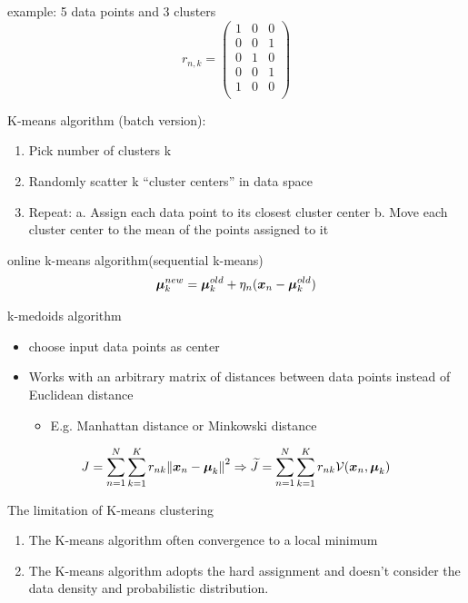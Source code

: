 \documentclass[11pt]{article}
\begin{document}
example: 5 data points and 3 clusters
\[
r_{n,k}=\begin{pmatrix}
 1 & 0 & 0 \\
 0 & 0 & 1 \\
 0 & 1 & 0 \\
 0 & 0 & 1 \\
 1 & 0 & 0 \\
\end{pmatrix}
\]

K-means algorithm (batch version):
\begin{enumerate}
\item Pick number of clusters k
\item Randomly scatter k “cluster centers” in data space
\item Repeat:
a. Assign each data point to its closest cluster center
b. Move each cluster center to the mean of the points assigned to it
\end{enumerate}


online k-means algorithm(sequential k-means)
\begin{equation*}
\boldsymbol{\mu}_k^{new}=\boldsymbol{\mu}_k^{old}+\eta_n(\boldsymbol{x}_n-\boldsymbol{\mu}_k^{old})
\end{equation*}


k-medoids algorithm
\begin{itemize}
\item choose input data points as center
\item Works with an arbitrary matrix of distances between data points instead of
Euclidean distance 
\begin{itemize}
\item E.g. Manhattan distance or Minkowski distance
\end{itemize}
\end{itemize}


\begin{equation*}
J=\displaystyle\sum_{n=1}^N \displaystyle\sum_{k=1}^Kr_{nk}
\norm{\boldsymbol{x}_n-\boldsymbol{\mu}_k}^2\Rightarrow
\widetilde{J}=\displaystyle\sum_{n=1}^N \displaystyle\sum_{k=1}^Kr_{nk}
\mathcal{V}(\boldsymbol{x}_n,\boldsymbol{\mu}_k)
\end{equation*}


The limitation of K-means clustering
\begin{enumerate}
\item The K-means algorithm often convergence to a local minimum
\item The K-means algorithm adopts the hard assignment and doesn’t consider the
data density and probabilistic distribution.
\end{enumerate}
\end{document}
